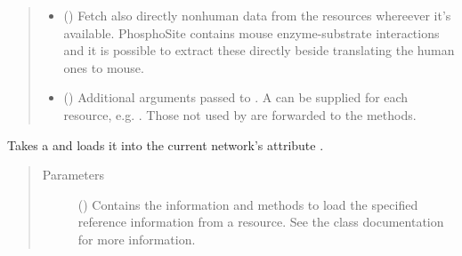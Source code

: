 \documentclass[letterpaper,10pt,english]{sphinxmanual}
\begin{document}
\begin{fulllineitems}
\begin{fulllineitems}
\begin{quote}
\begin{description}
\begin{itemize}
\item {} 
 () \textendash{} Fetch also directly nonhuman
data from the resources whereever it’s available. PhosphoSite
contains mouse enzyme-substrate interactions and it is possible
to extract these directly beside translating the human ones
to mouse.

\item {} 
 () \textendash{} Additional arguments passed to .
A  can be supplied for each resource, e.g.
.
Those not used by  are forwarded to the
 methods.

\end{itemize}

\end{description}\end{quote}

\end{fulllineitems}


\begin{fulllineitems}
\label{\detokenize{main:pypath.main.PyPath.load_reflist}}
Takes a  and loads it
into the current network’s attribute
.
\begin{quote}\begin{description}
\item[{Parameters}] \leavevmode
{} () \textendash{} Contains the information and methods to load the specified
reference information from a resource. See the class
documentation for more information.

\end{description}\end{quote}

\end{fulllineitems}



\end{fulllineitems}
\end{document}
